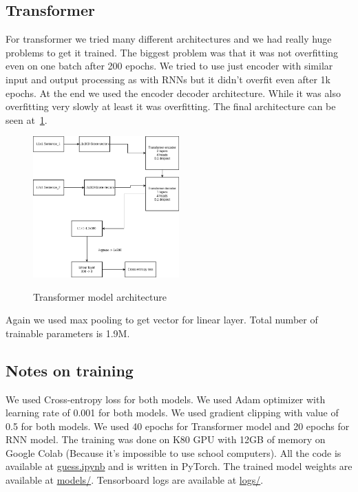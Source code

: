 \documentclass{article}
\begin{document}
    \subsection{Transformer}
    For transformer we tried many different architectures and we had really huge problems to get it trained.
    The biggest problem was that it was not overfitting even on one batch after 200 epochs.
    We tried to use just encoder with similar input and output processing as with RNNs but it didn't overfit even after 1k epochs.
    At the end we used the encoder decoder architecture. While it was also overfitting very slowly at least it was overfitting.
    The final architecture can be seen at~\ref{fig:transformer_model}.
    \begin{figure}[h!]
        \centering
        \includegraphics[width=0.5\textwidth]{Transfomer.png}\label{fig:transformer_model}
        \caption{Transformer model architecture}
    \end{figure}

    Again we used max pooling to get vector for linear layer.
    Total number of trainable parameters is 1.9M.


    \subsection{Notes on training}
    We used Cross-entropy loss for both models.
    We used Adam optimizer with learning rate of 0.001 for both models.
    We used gradient clipping with value of 0.5 for both models.
    We used 40 epochs for Transformer model and 20 epochs for RNN model.
    The training was done on K80 GPU with 12GB of memory on Google Colab (Because it's impossible to use school computers).
    All the code is available at \url{guess.ipynb} and is written in PyTorch.
    The trained model weights are available at \url{models/}.
    Tensorboard logs are available at \url{logs/}.
\end{document}

